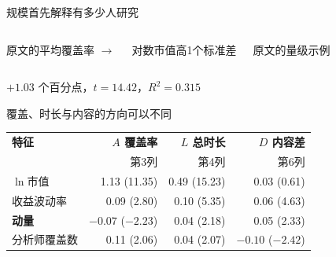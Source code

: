 \begin{frame}{规模首先解释有多少人研究}
  \vfill
  \begin{columns}[c,onlytextwidth]
    \centering
      \par\small 原文的平均覆盖率
    \centering
      {\Large\textcolor{slate}{\(\longrightarrow\)}}\par
      \small 对数市值高1个标准差
    \centering
      \par\small 原文的量级示例
  \end{columns}
  \medskip
  {\small\centering \(+1.03\) 个百分点，\(t=14.42\)，\(R^2=0.315\)\par}
  \vfill
\end{frame}

\begin{frame}{覆盖、时长与内容的方向可以不同}
  {\small
  \begin{tabularx}{\linewidth}{@{}Yrrr@{}}
    \toprule
    \textbf{特征} & \textbf{$A$ 覆盖率} & \textbf{$L$ 总时长} & \textbf{$D$ 内容差}\\
     & {\scriptsize 第3列} & {\scriptsize 第4列} & {\scriptsize 第6列}\\
    \midrule
    \(\ln\)市值 & 1.13 {\scriptsize (11.35)} & 0.49 {\scriptsize (15.23)} & 0.03 {\scriptsize (0.61)}\\
    收益波动率 & 0.09 {\scriptsize (2.80)} & 0.10 {\scriptsize (5.35)} & 0.06 {\scriptsize (4.63)}\\
    \textcolor{wine}{\textbf{动量}} & \textcolor{wine}{\(-0.07\) {\scriptsize (\(-2.23\))}} &
        \textcolor{wine}{0.04 {\scriptsize (2.18)}} & \textcolor{wine}{0.05 {\scriptsize (2.33)}}\\
    分析师覆盖数 & 0.11 {\scriptsize (2.06)} & 0.04 {\scriptsize (2.07)} & \(-0.10\) {\scriptsize (\(-2.42\))}\\
    \bottomrule
  \end{tabularx}}
\end{frame}

